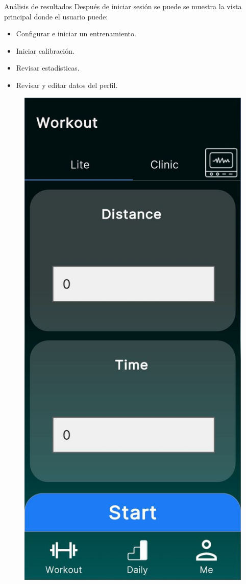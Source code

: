 \begin{thesischapter}{3} {Análisis de resultados}
    Después de iniciar sesión se puede se muestra la vista principal donde el usuario puede:
    \begin{itemize}
        \item Configurar e iniciar un entrenamiento.
        \item Iniciar calibración.
        \item Revisar estadísticas.
        \item Revisar y editar datos del perfil. 
    \end{itemize} 

    \begin{figure}[ht]
        \centering
        \includegraphics[scale=0.17]{images/ui/2.jpg}

\end{figure}
\end{thesischapter}
